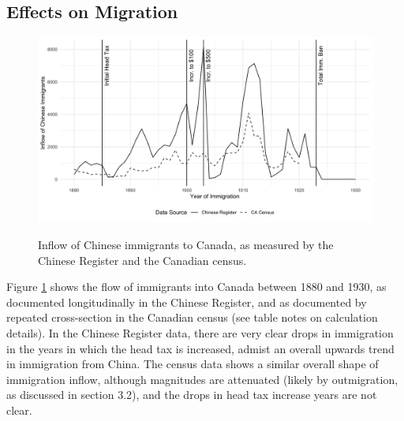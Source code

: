 \documentclass[12pt]{article}
\begin{document}
\subsection{Effects on Migration}

\begin{figure}
    \centering 
    \caption{Inflow of Chinese immigrants to Canada, as measured by the Chinese Register and the Canadian census.}
    \includegraphics[width=\textwidth]{../../figs/shortpaper_figs/fig2_flow.png}
    \label{fig:inflow}
\end{figure}

Figure \ref{fig:inflow} shows the flow of immigrants into Canada between 1880 and 1930, as documented longitudinally in the Chinese Register, and as documented by repeated cross-section in the Canadian census (see table notes on calculation details). In the Chinese Register data, there are very clear drops in immigration in the years in which the head tax is increased, admist an overall upwards trend in immigration from China. The census data shows a similar overall shape of immigration inflow, although magnitudes are attenuated (likely by outmigration, as discussed in section 3.2), and the drops in head tax increase years are not clear.  
\end{document}
